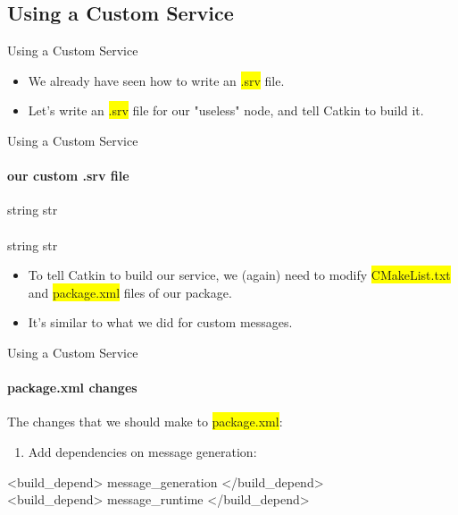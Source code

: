 \documentclass{beamer}
\begin{document}
\subsection{Using a Custom Service}

\begin{frame}{Using a Custom Service}
    \begin{itemize}
        \item We already have seen how to write an {\ttfamily \colorbox{yellow}{.srv}} file.

        \vspace{5mm}

        \item Let's write an {\ttfamily \colorbox{yellow}{.srv}} file for our "useless" node, and tell Catkin to build it.
    \end{itemize}
\end{frame}

\begin{frame}{Using a Custom Service}
    \framesubtitle{our custom .srv file}
    \begin{focus}
        \ttfamily
        string  \hspace{0.5cm} str\\
        \textemdash \textemdash \textemdash \\
        string  \hspace{0.5cm} str\\
    \end{focus} 
    \vspace{2mm}
    \begin{itemize}
        \item To tell Catkin to build our service, we (again) need to modify {\ttfamily \colorbox{yellow}{CMakeList.txt}} and {\ttfamily \colorbox{yellow}{package.xml}} files of our package.
        \vspace{2mm}
        \item It's similar to what we did for custom messages.
    \end{itemize}      
\end{frame}

\begin{frame}{Using a Custom Service}
    \framesubtitle{package.xml changes}

    The changes that we should make to {\ttfamily \colorbox{yellow}{package.xml}}:
    \begin{enumerate}
        \item Add dependencies on message generation:
    \end{enumerate}  
    \begin{focus}
        \ttfamily \scriptsize
        {\color{blue}<build\_depend>} message\_generation {\color{blue}</build\_depend>}\\
        
        {\color{blue}<build\_depend>} message\_runtime {\color{blue}</build\_depend>}\\
    \end{focus}         
\end{frame}
\end{document}
